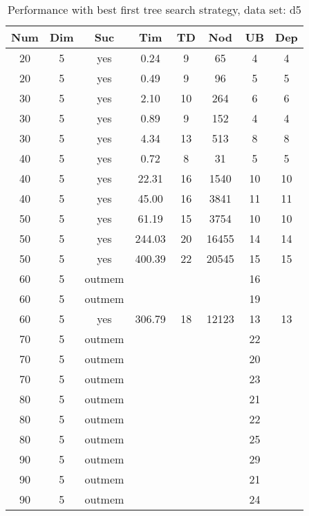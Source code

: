 \begin{table}[!htb]
  \centering
  \begin{tabular}[center]{|c|c|c|c|c|c|c|c|}
    \hline
    Num & Dim & Suc & Tim & TD & Nod & UB & Dep \\
    \hline
    20 & 5 & yes & 0.24 & 9 & 65 & 4 & 4 \\
    20 & 5 & yes & 0.49 & 9 & 96 & 5 & 5 \\
    30 & 5 & yes & 2.10 & 10 & 264 & 6 & 6 \\
    30 & 5 & yes & 0.89 & 9 & 152 & 4 & 4 \\
    30 & 5 & yes & 4.34 & 13 & 513 & 8 & 8 \\
    40 & 5 & yes & 0.72 & 8 & 31 & 5 & 5 \\
    40 & 5 & yes & 22.31 & 16 & 1540 & 10 & 10 \\
    40 & 5 & yes & 45.00 & 16 & 3841 & 11 & 11 \\
    50 & 5 & yes & 61.19 & 15 & 3754 & 10 & 10 \\
    50 & 5 & yes & 244.03 & 20 & 16455 & 14 & 14 \\
    50 & 5 & yes & 400.39 & 22 & 20545 & 15 & 15 \\
    60 & 5 & outmem &&&& 16 &\\
    60 & 5 & outmem &&&& 19 &\\
    60 & 5 & yes & 306.79 & 18 & 12123 & 13 & 13 \\
    70 & 5 & outmem &&&& 22 &\\
    70 & 5 & outmem &&&& 20 &\\
    70 & 5 & outmem &&&& 23 &\\
    80 & 5 & outmem &&&& 21 &\\
    80 & 5 & outmem &&&& 22 &\\
    80 & 5 & outmem &&&& 25 &\\
    90 & 5 & outmem &&&& 29 &\\
    90 & 5 & outmem &&&& 21 &\\
    90 & 5 & outmem &&&& 24 &\\
    \hline
  \end{tabular}
  \caption{Performance with best first tree search strategy, data set: d5}
  \label{tab:test.sel-d5}
\end{table}

